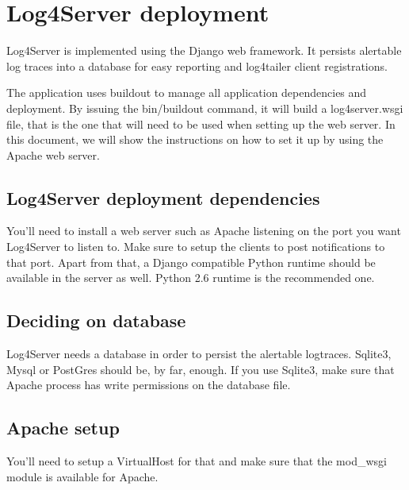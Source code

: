 \section{Log4Server deployment}
Log4Server is implemented using the Django web framework. It persists alertable log traces into a 
database for easy reporting and log4tailer client registrations. 

The application uses buildout to manage all application dependencies and deployment. By issuing 
the bin/buildout command, it will build a log4server.wsgi file, that is the one that will need to 
be used when setting up the web server. In this document, we will show the instructions on how to 
set it up by using the Apache web server. 

\subsection{Log4Server deployment dependencies}

You'll need to install a web server such as Apache listening on the port you want Log4Server to listen 
to. Make sure to setup the clients to post notifications to that port. Apart from that, a Django 
compatible Python runtime should be available in the server as well. Python 2.6 runtime 
is the recommended one. 

\subsection{Deciding on database}

Log4Server needs a database in order to persist the alertable logtraces. Sqlite3, Mysql or PostGres 
should be, by far, enough. If you use Sqlite3, make sure that Apache process has write permissions 
on the database file. 

\subsection{Apache setup}

You'll need to setup a VirtualHost for that and make sure that the mod\_wsgi module is available 
for Apache. 

\newpage
